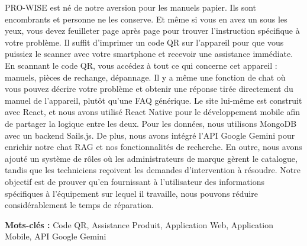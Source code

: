\documentclass[12pt,a4paper]{report}
\begin{document}
PRO-WISE est né de notre aversion pour les manuels papier. Ils sont encombrants et personne ne les conserve. Et même si vous en avez un sous les yeux, vous devez feuilleter page après page pour trouver l'instruction spécifique à votre problème.
Il suffit d'imprimer un code QR sur l'appareil pour que vous puissiez le scanner avec votre smartphone et recevoir une assistance immédiate.
En scannant le code QR, vous accédez à tout ce qui concerne cet appareil : manuels, pièces de rechange, dépannage. Il y a même une fonction de chat où vous pouvez décrire votre problème et obtenir une réponse tirée directement du manuel de l'appareil, plutôt qu'une FAQ générique.
Le site lui-même est construit avec React, et nous avons utilisé React Native pour le développement mobile afin de partager la logique entre les deux. Pour les données, nous utilisons MongoDB avec un backend Sails.js. De plus, nous avons intégré l'API Google Gemini pour enrichir notre chat RAG et nos fonctionnalités de recherche. En outre, nous avons ajouté un système de rôles où les administrateurs de marque gèrent le catalogue, tandis que les techniciens reçoivent les demandes d'intervention à résoudre.
Notre objectif est de prouver qu'en fournissant à l'utilisateur des informations spécifiques à l'équipement sur lequel il travaille, nous pouvons réduire considérablement le temps de réparation.

\vspace{0.15cm}
\textbf{Mots-clés :} Code QR, Assistance Produit, Application Web, Application Mobile, API Google Gemini
\endgroup
\end{document}
